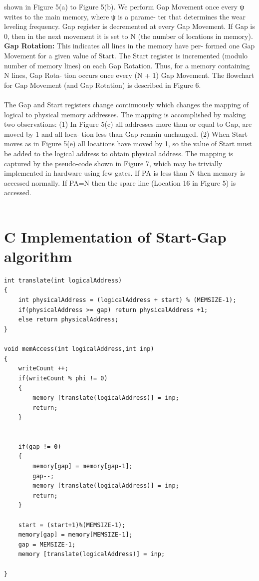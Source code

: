 \documentclass[11pt, conference, onecolumn]{IEEEtran}
\begin{document}
shown in Figure 5(a) to Figure 5(b). We perform Gap Movement
once every ψ writes to the main memory, where ψ is a parame-
ter that determines the wear leveling frequency. Gap register is
decremented at every Gap Movement. If Gap is 0, then in the next
movement it is set to N (the number of locations in memory).
\\\textbf{Gap Rotation:} This indicates all lines in the memory have per-
formed one Gap Movement for a given value of Start. The Start
register is incremented (modulo number of memory lines) on each
Gap Rotation. Thus, for a memory containing N lines, Gap Rota-
tion occurs once every (N + 1) Gap Movement. The flowchart for
Gap Movement (and Gap Rotation) is described in Figure 6.\\
\\The Gap and Start registers change continuously which changes
the mapping of logical to physical memory addresses. The mapping
is accomplished by making two observations: (1) In Figure 5(c) all
addresses more than or equal to Gap, are moved by 1 and all loca-
tion less than Gap remain unchanged. (2) When Start moves as in Figure 5(e) all locations have moved by 1, so the value of Start
must be added to the logical address to obtain physical address. The
mapping is captured by the pseudo-code shown in Figure 7, which
may be trivially implemented in hardware using few gates. If PA is
less than N then memory is accessed normally. If PA=N then the
spare line (Location 16 in Figure 5) is accessed.
\\
\\
\section{C Implementation of Start-Gap algorithm}
\begin{verbatim}
int translate(int logicalAddress)
{
	int physicalAddress = (logicalAddress + start) % (MEMSIZE-1);
	if(physicalAddress >= gap) return physicalAddress +1;
	else return physicalAddress;
}

void memAccess(int logicalAddress,int inp)
{
	writeCount ++;
	if(writeCount % phi != 0)
	{
		memory [translate(logicalAddress)] = inp;
		return;
	}
	

	if(gap != 0)
	{
		memory[gap] = memory[gap-1];
		gap--;
		memory [translate(logicalAddress)] = inp;
		return;
	}

	start = (start+1)%(MEMSIZE-1);
	memory[gap] = memory[MEMSIZE-1];
	gap = MEMSIZE-1;
	memory [translate(logicalAddress)] = inp;

}
\end{verbatim}
\end{document}
